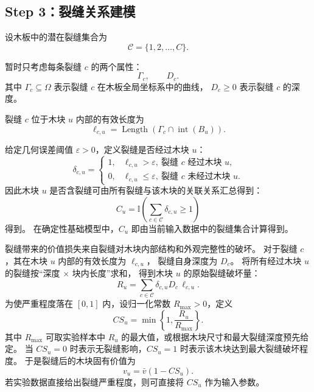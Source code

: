 ﻿\documentclass[UTF8,12pt,a4paper]{ctexart}
\begin{document}
\subsection{Step 3：裂缝关系建模}

\begin{description}[leftmargin=2em,labelsep=0.5em,itemsep=0.6em]
  \item[\textbf{裂缝集合：}]
设木板中的潜在裂缝集合为
\[
\mathcal C=\{1,2,\ldots,C\}.
\]

  \item[\textbf{单条裂缝属性：}]
暂时只考虑每条裂缝 \(c\) 的两个属性：
\[
\Gamma_c,\qquad D_c.
\]
其中 \(\Gamma_c\subseteq\Omega\) 表示裂缝 \(c\) 在木板全局坐标系中的曲线，
\(D_c\ge0\) 表示裂缝 \(c\) 的深度。

  \item[\textbf{块内裂缝长度：}]
裂缝 \(c\) 位于木块 \(u\) 内部的有效长度为
\[
\ell_{c,u}
=
\operatorname{Length}
\left(
\Gamma_c\cap\operatorname{int}(B_u)
\right).
\]

  \item[\textbf{裂缝--木块关联：}]
给定几何误差阈值 \(\varepsilon>0\)，定义裂缝是否经过木块 \(u\)：
\[
\delta_{c,u}
=
\begin{cases}
1, & \ell_{c,u}>\varepsilon,\ \text{裂缝 \(c\) 经过木块 \(u\)},\\
0, & \ell_{c,u}\le\varepsilon,\ \text{裂缝 \(c\) 未经过木块 \(u\)}.
\end{cases}
\]
因此木块 \(u\) 是否含裂缝可由所有裂缝与该木块的关联关系汇总得到：
\[
C_u=
\mathbb I\left(
\sum_{c\in\mathcal C}\delta_{c,u}\ge 1
\right)
\]
得到。
在确定性基础模型中，\(C_u\) 即由当前输入数据中的裂缝集合计算得到。

  \item[\textbf{块内严重程度与价值损失：}]
裂缝带来的价值损失来自裂缝对木块内部结构和外观完整性的破坏。
对于裂缝 \(c\)，其在木块 \(u\) 内部的有效长度为 \(\ell_{c,u}\)，
裂缝自身深度为 \(D_c\)。
将所有经过木块 \(u\) 的裂缝按“深度 \(\times\) 块内长度”求和，
得到木块 \(u\) 的原始裂缝破坏量：
\[
R_u
=
\sum_{c\in\mathcal C}
\delta_{c,u}D_c\,\ell_{c,u}.
\]
为使严重程度落在 \([0,1]\) 内，设归一化常数 \(R_{\max}>0\)，定义
\[
CS_u
=
\min\left\{1,\frac{R_u}{R_{\max}}\right\}.
\]
其中 \(R_{\max}\) 可取实验样本中 \(R_u\) 的最大值，或根据木块尺寸和最大裂缝深度预先给定。
当 \(CS_u=0\) 时表示无裂缝影响，\(CS_u=1\) 时表示该木块达到最大裂缝破坏程度。
于是裂缝后的木块固有价值为
\[
v_u=\bar v(1-CS_u).
\]
若实验数据直接给出裂缝严重程度，则可直接将 \(CS_u\) 作为输入参数。


\end{description}
\end{document}
